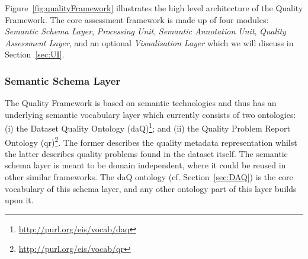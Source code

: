 Figure~\ref{fig:qualityFramework} illustrates the high level architecture of the Quality Framework.
The core assessment framework is made up of four modules: \emph{Semantic Schema Layer}, \emph{Processing Unit}, \emph{Semantic Annotation Unit}, \emph{Quality Assessment Layer}, and an optional \emph{Visualisation Layer} which we will discuss in Section~\ref{sec:UI}.

\subsubsection{Semantic Schema Layer}
The Quality Framework is based on semantic technologies and thus has an underlying semantic vocabulary layer which currently consists of two ontologies: (i) the Dataset Quality Ontology (daQ)\footnote{\url{http://purl.org/eis/vocab/daq}}; and (ii) the Quality Problem Report Ontology (qr)\footnote{\url{http://purl.org/eis/vocab/qr}}. 
The former describes the quality metadata representation whilst the latter describes quality problems found in the dataset itself. 
The semantic schema layer is meant to be domain independent, where it could be reused in other similar frameworks. 
The daQ ontology (cf. Section~\ref{sec:DAQ}) is the core vocabulary of this schema layer, and any other ontology part of this layer builds upon it.

